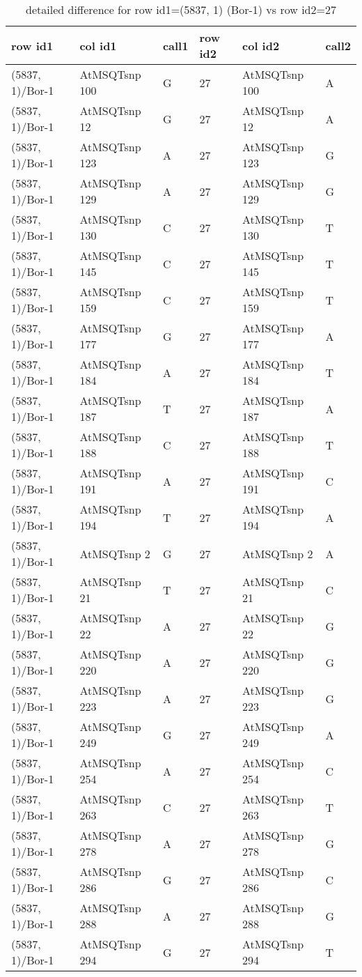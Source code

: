 \begin{center}
\begin{longtable}{|l|l|l|l|l|l|}
\caption{detailed difference for row id1=(5837, 1) (Bor-1) vs row id2=27} \label{table_dm3}\\
\hline
row id1&col id1&call1&row id2&col id2&call2\\
\hline
(5837, 1)/Bor-1&AtMSQTsnp 100&G&27&AtMSQTsnp 100&A\\
(5837, 1)/Bor-1&AtMSQTsnp 12&G&27&AtMSQTsnp 12&A\\
(5837, 1)/Bor-1&AtMSQTsnp 123&A&27&AtMSQTsnp 123&G\\
(5837, 1)/Bor-1&AtMSQTsnp 129&A&27&AtMSQTsnp 129&G\\
(5837, 1)/Bor-1&AtMSQTsnp 130&C&27&AtMSQTsnp 130&T\\
(5837, 1)/Bor-1&AtMSQTsnp 145&C&27&AtMSQTsnp 145&T\\
(5837, 1)/Bor-1&AtMSQTsnp 159&C&27&AtMSQTsnp 159&T\\
(5837, 1)/Bor-1&AtMSQTsnp 177&G&27&AtMSQTsnp 177&A\\
(5837, 1)/Bor-1&AtMSQTsnp 184&A&27&AtMSQTsnp 184&T\\
(5837, 1)/Bor-1&AtMSQTsnp 187&T&27&AtMSQTsnp 187&A\\
(5837, 1)/Bor-1&AtMSQTsnp 188&C&27&AtMSQTsnp 188&T\\
(5837, 1)/Bor-1&AtMSQTsnp 191&A&27&AtMSQTsnp 191&C\\
(5837, 1)/Bor-1&AtMSQTsnp 194&T&27&AtMSQTsnp 194&A\\
(5837, 1)/Bor-1&AtMSQTsnp 2&G&27&AtMSQTsnp 2&A\\
(5837, 1)/Bor-1&AtMSQTsnp 21&T&27&AtMSQTsnp 21&C\\
(5837, 1)/Bor-1&AtMSQTsnp 22&A&27&AtMSQTsnp 22&G\\
(5837, 1)/Bor-1&AtMSQTsnp 220&A&27&AtMSQTsnp 220&G\\
(5837, 1)/Bor-1&AtMSQTsnp 223&A&27&AtMSQTsnp 223&G\\
(5837, 1)/Bor-1&AtMSQTsnp 249&G&27&AtMSQTsnp 249&A\\
(5837, 1)/Bor-1&AtMSQTsnp 254&A&27&AtMSQTsnp 254&C\\
(5837, 1)/Bor-1&AtMSQTsnp 263&C&27&AtMSQTsnp 263&T\\
(5837, 1)/Bor-1&AtMSQTsnp 278&A&27&AtMSQTsnp 278&G\\
(5837, 1)/Bor-1&AtMSQTsnp 286&G&27&AtMSQTsnp 286&C\\
(5837, 1)/Bor-1&AtMSQTsnp 288&A&27&AtMSQTsnp 288&G\\
(5837, 1)/Bor-1&AtMSQTsnp 294&G&27&AtMSQTsnp 294&T\\

\end{longtable}
\end{center}
